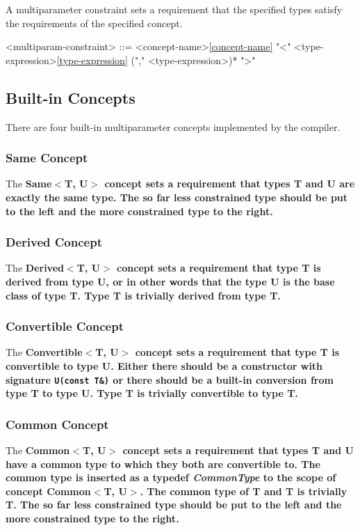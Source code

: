 \documentclass[a4paper,oneside,11pt]{article}
\begin{document}
A multiparameter constraint sets a requirement that the specified types satisfy the requirements of the specified concept.

\begin{grammar}
\label{multiparam-constraint}<multiparam-constraint> ::= <concept-name>\ref{concept-name} "<" <type-expression>\ref{type-expression} ("," <type-expression>)* ">"
\end{grammar}

\subsection{Built-in Concepts}

There are four built-in multiparameter concepts implemented by the compiler.

\subsubsection{Same Concept}

The \bf{Same$<$T, U$>$} concept sets a requirement that types T and U are exactly the same type.
The so far less constrained type should be put to the left and the more constrained type to the right.

\subsubsection{Derived Concept}

The \bf{Derived$<$T, U$>$} concept sets a requirement that type T is derived from type U, or in other words that the type U is the base class of type T. Type T is trivially derived from type T.

\subsubsection{Convertible Concept}

The \bf{Convertible$<$T, U$>$} concept sets a requirement that type T is convertible to type U.
Either there should be a constructor with signature \verb|U(const T&)| or there should be a built-in conversion
from type T to type U. Type T is trivially convertible to type T.

\subsubsection{Common Concept}

The \bf{Common$<$T, U$>$} concept sets a requirement that types T and U have a common type to which they both are convertible to. The common type is inserted as a typedef \emph{CommonType} to the scope of concept \bf{Common$<$T, U$>$}. The common type of T and T is trivially T.
The so far less constrained type should be put to the left and the more constrained type to the right.
\end{document}
